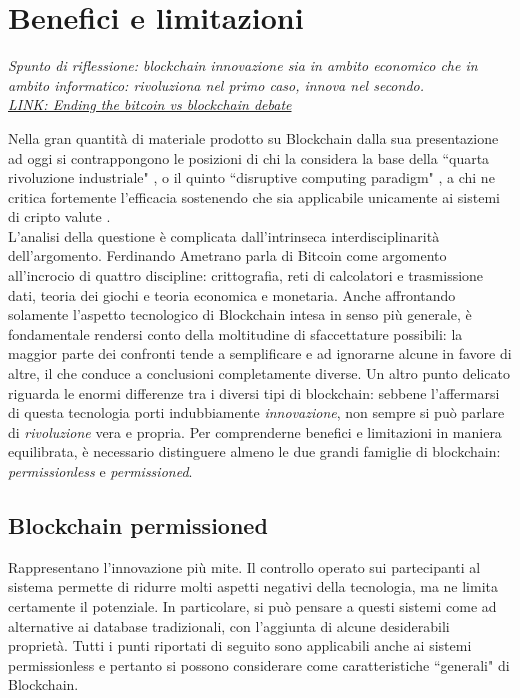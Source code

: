 \section{Benefici e limitazioni}
	\emph{Spunto di riflessione: blockchain innovazione sia in ambito economico che in ambito informatico: rivoluziona nel primo caso, innova nel secondo. \\
	\href{https://www.linkedin.com/pulse/ending-bitcoin-vs-blockchain-debate-gideon-greenspan}{LINK: Ending the bitcoin vs blockchain debate}}
	
	Nella gran quantità di materiale prodotto su Blockchain dalla sua presentazione ad oggi si contrappongono le posizioni di chi la considera la base della ``quarta rivoluzione industriale" \cite{4industrialrevo}, o il quinto ``disruptive computing paradigm" \cite{blockchain_swan}, a chi ne critica fortemente l'efficacia sostenendo che sia applicabile unicamente ai sistemi di cripto valute \cite{what_is_it_good_for}. \\
	L'analisi della questione è complicata dall'intrinseca interdisciplinarità dell'argomento. Ferdinando Ametrano parla di Bitcoin \cite{Ametrano_slides} come argomento all'incrocio di quattro discipline: crittografia, reti di calcolatori e trasmissione dati, teoria dei giochi e teoria economica e monetaria. Anche affrontando solamente l'aspetto tecnologico di Blockchain intesa in senso più generale, è fondamentale rendersi conto della moltitudine di sfaccettature possibili: la maggior parte dei confronti tende a semplificare e ad ignorarne alcune in favore di altre, il che conduce a conclusioni completamente diverse. Un altro punto delicato riguarda le enormi differenze tra i diversi tipi di blockchain: sebbene l'affermarsi di questa tecnologia porti indubbiamente \emph{innovazione}, non sempre si può parlare di \emph{rivoluzione} vera e propria. Per comprenderne benefici e limitazioni in maniera equilibrata, è necessario distinguere almeno le due grandi famiglie di blockchain: \emph{permissionless} e \emph{permissioned}.
	\subsection{Blockchain permissioned}
		Rappresentano l'innovazione più mite. Il controllo operato sui partecipanti al sistema permette di ridurre molti aspetti negativi della tecnologia, ma ne limita certamente il potenziale. In particolare, si può pensare a questi sistemi come ad alternative ai database tradizionali, con l'aggiunta di alcune desiderabili proprietà. Tutti i punti riportati di seguito sono applicabili anche ai sistemi permissionless e pertanto si possono considerare come caratteristiche ``generali" di Blockchain.
